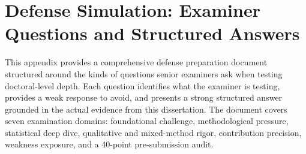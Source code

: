 
\section{Defense Simulation: Examiner Questions and Structured Answers}
\label{app:defense_simulation}

This appendix provides a comprehensive defense preparation document structured around the kinds of questions senior examiners ask when testing doctoral-level depth. Each question identifies what the examiner is testing, provides a weak response to avoid, and presents a strong structured answer grounded in the actual evidence from this dissertation. The document covers seven examination domains: foundational challenge, methodological pressure, statistical deep dive, qualitative and mixed-method rigor, contribution precision, weakness exposure, and a 40-point pre-submission audit.

